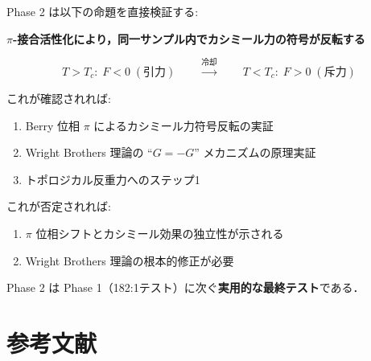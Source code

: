 \documentclass[11pt,a4paper]{article}
\begin{document}
\begin{keyresult}
Phase 2 は以下の命題を直接検証する:

\begin{center}
\textbf{$\pi$-接合活性化により，同一サンプル内でカシミール力の符号が反転する}
\end{center}

\begin{equation}
T > T_c:\; F < 0\;(\text{引力})
\qquad\xrightarrow{\text{冷却}}\qquad
T < T_c:\; F > 0\;(\text{斥力})
\end{equation}

これが確認されれば:
\begin{enumerate}
\item Berry 位相 $\pi$ によるカシミール力符号反転の実証
\item Wright Brothers 理論の ``$G = -G$'' メカニズムの原理実証
\item トポロジカル反重力へのステップ1
\end{enumerate}

これが否定されれば:
\begin{enumerate}
\item $\pi$ 位相シフトとカシミール効果の独立性が示される
\item Wright Brothers 理論の根本的修正が必要
\end{enumerate}

Phase 2 は Phase 1（182:1テスト）に次ぐ\textbf{実用的な最終テスト}である．
\end{keyresult}


\newpage
\section*{参考文献}
\end{document}
